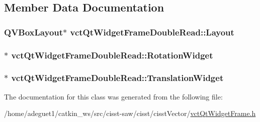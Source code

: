 \subsection{Member Data Documentation}
\hypertarget{classvct_qt_widget_frame_double_read_a084b914e4eb2577cb495d249b441694e}{
\subsubsection[{Layout}]{\setlength{\rightskip}{0pt plus 5cm}Q\-V\-Box\-Layout$\ast$ vct\-Qt\-Widget\-Frame\-Double\-Read\-::\-Layout\hspace{0.3cm}{\ttfamily [protected]}}}\label{classvct_qt_widget_frame_double_read_a084b914e4eb2577cb495d249b441694e}
\hypertarget{classvct_qt_widget_frame_double_read_a7044426a9061234c402ba1ce2f64113d}{
\subsubsection[{Rotation\-Widget}]{$\ast$ vct\-Qt\-Widget\-Frame\-Double\-Read\-::\-Rotation\-Widget\hspace{0.3cm}{\ttfamily [protected]}}}\label{classvct_qt_widget_frame_double_read_a7044426a9061234c402ba1ce2f64113d}
\hypertarget{classvct_qt_widget_frame_double_read_a2795e93ee9010d34c7e5af32f555ecdd}{
\subsubsection[{Translation\-Widget}]{$\ast$ vct\-Qt\-Widget\-Frame\-Double\-Read\-::\-Translation\-Widget\hspace{0.3cm}{\ttfamily [protected]}}}\label{classvct_qt_widget_frame_double_read_a2795e93ee9010d34c7e5af32f555ecdd}


The documentation for this class was generated from the following file\-:\begin{DoxyCompactItemize}
\item 
/home/adeguet1/catkin\-\_\-ws/src/cisst-\/saw/cisst/cisst\-Vector/\hyperlink{vct_qt_widget_frame_8h}{vct\-Qt\-Widget\-Frame.\-h}\end{DoxyCompactItemize}
